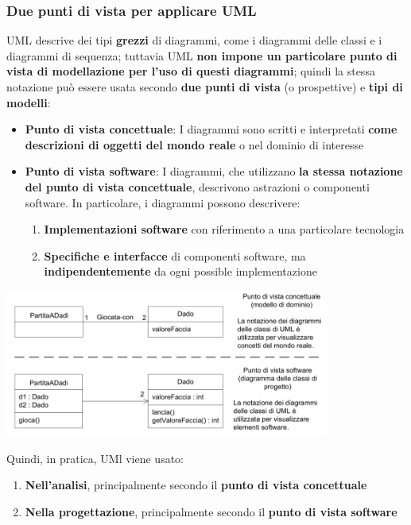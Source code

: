\documentclass[12pt]{article}
\begin{document}
\subsubsection{Due punti di vista per applicare UML}
UML descrive dei tipi \textbf{grezzi} di diagrammi, come i diagrammi delle classi e i diagrammi di sequenza; tuttavia UML \textbf{non impone un particolare punto di vista di modellazione per l'uso di questi diagrammi}; 
quindi la stessa notazione può essere usata secondo \textbf{due punti di vista} (o prospettive) e \textbf{tipi di modelli}:
\begin{itemize}
    \item \textbf{Punto di vista concettuale}: I diagrammi sono scritti e interpretati \textbf{come descrizioni di oggetti del mondo reale} o nel dominio di interesse
    \item \textbf{Punto di vista software}: I diagrammi, che utilizzano \textbf{la stessa notazione del punto di vista concettuale}, descrivono astrazioni o componenti software. In particolare, i diagrammi possono descrivere:
    \begin{enumerate}
        \item \textbf{Implementazioni software} con riferimento a una particolare tecnologia
        \item \textbf{Specifiche e interfacce} di componenti software, ma \textbf{indipendentemente} da ogni possible implementazione
    \end{enumerate}
\end{itemize}
\begin{center}
    \includegraphics[width = 0.80\textwidth]{Images/11.PNG}
\end{center}
Quindi, in pratica, UMl viene usato:
\begin{enumerate}
    \item \textbf{Nell'analisi}, principalmente secondo il \textbf{punto di vista concettuale}
    \item \textbf{Nella progettazione}, principalmente secondo il \textbf{punto di vista software}
\end{enumerate}
\end{document}
